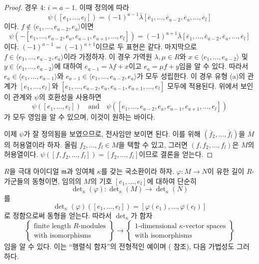 \begin{proof}
\medskip\noindent
경우 4: $i = a - 1$. 이때 정의에 따라
$$
\psi([e_1, \ldots, e_l]) =
(-1)^{a - 1}
\overline{\lambda}
[\overline{e}_1,
\ldots,
\overline{e}_{a - 2},
\overline{e}_a,
\ldots,
\overline{e}_l]
$$
이다. $f \not \in \langle e_1, \ldots, e_{a - 2}, e_a \rangle$이면
$$
\psi(-[e_1, \ldots, e_{a - 2}, e_a, e_{a - 1}, e_{a + 1}, \ldots, e_l]) =
(-1)^{a + 1}\overline{\lambda}
[\overline{e}_1,
\ldots,
\overline{e}_{a - 2},
\overline{e}_a,
\ldots,
\overline{e}_l]
$$
이다. $(-1)^{a - 1} = (-1)^{a + 1}$이므로 두 표현은 같다.
마지막으로 $f \in \langle e_1, \ldots, e_{a - 2}, e_a \rangle$이라
가정하자. 이 경우 가역원 $\lambda, \mu \in R$와
$x \in \langle e_1, \ldots, e_{a - 2}\rangle$ 및
$y \in \langle e_1, \ldots, e_{a - 2}\rangle$에 대하여
$e_{a - 1} = \lambda f + x$이고 $e_a = \mu f + y$임을 알 수 있다.
따라서
$e_a \in \langle e_1, \ldots, e_{a - 1} \rangle$와
$e_{a - 1} \in \langle e_1, \ldots, e_{a - 2}, e_a\rangle$가 모두
성립한다. 이 경우 유형 (a)의 관계가
$[e_1, \ldots, e_l]$와
$[e_1, \ldots, e_{a - 2}, e_a, e_{a - 1}, e_{a + 1}, \ldots, e_l]$
모두에 적용된다. 위에서 보인 이 관계와 $\psi$의 호환성을 사용하면
$$
\psi([e_1, \ldots, e_l])
\quad\text{and}\quad
\psi([e_1, \ldots, e_{a - 2}, e_a, e_{a - 1}, e_{a + 1}, \ldots, e_l])
$$
가 모두 영임을 알 수 있으며, 이것이 원하는 바이다.

\medskip\noindent
이제 $\psi$가 잘 정의됨을 보였으므로, 전사임만 보이면 된다. 이를 위해
$(\overline{f}_2, \ldots, \overline{f}_l)$을 $\overline{M}$의 허용열이라
하자. 올림 $f_2, \ldots, f_l \in M$을 택할 수 있고, 그러면
$(f, f_2, \ldots, f_l)$은 $M$의 허용열이다.
$\psi([f, f_2, \ldots, f_l]) = [f_2, \ldots, f_l]$이므로 결론을 얻는다.
\end{proof}

\noindent
$R$을 극대 아이디얼 $\mathfrak m$과 잉여체 $\kappa$를 갖는 국소환이라
하자. $\varphi : M \to N$이 유한 길이 $R$-가군들의 동형이면, 임의의
$M$의 기호 $[e_1, \ldots, e_l]$에 대하여 단순히
$$
\det\nolimits_\kappa(\varphi) :
\det\nolimits_\kappa(M)
\to
\det\nolimits_\kappa(N)
$$
를
$$
\det\nolimits_\kappa(\varphi)([e_1, \ldots, e_l])
=
[\varphi(e_1), \ldots, \varphi(e_l)]
$$
로 정함으로써 동형을 얻는다. 따라서 $\det\nolimits_\kappa$가 함자
\begin{equation}
\label{equation-functor}
\left\{
\begin{matrix}
\text{finite length }R\text{-modules}\\
\text{with isomorphisms}
\end{matrix}
\right\}
\longrightarrow
\left\{
\begin{matrix}
1\text{-dimensional }\kappa\text{-vector spaces}\\
\text{with isomorphisms}
\end{matrix}
\right\}
\end{equation}
임을 알 수 있다. 이는 ``행렬식 함자''의 전형적인 예이며
(\cite{Knudsen} 참조), 다음 가법성도 그러하다.


